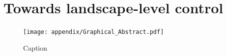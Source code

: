 \chapter{Towards landscape-level control}

\blindtext

\blindtext

\begin{figure}
    \centering
    \texttt{[image: appendix/Graphical\_Abstract.pdf]}
    \caption{Caption}
    \label{fig:my_label}
\end{figure}




